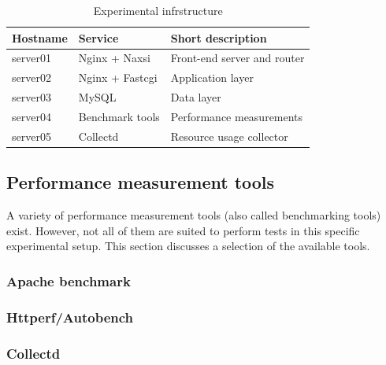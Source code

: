 \documentclass[Methods]{subfiles}
\begin{document}
\begin{table}[H]
\caption{Experimental infrstructure}
\begin{tabular}{|p{}|p{}|p{5cm}|}
\hline
\textbf{Hostname} & \textbf{Service} & \textbf{Short description} \\ \hline
server01 & Nginx + Naxsi & Front-end server and router \\ \hline
server02 & Nginx + Fastcgi & Application layer \\ \hline
server03 & MySQL & Data layer \\ \hline
server04 & Benchmark tools & Performance measurements \\ \hline
server05 & Collectd & Resource usage collector \\ \hline
\end{tabular}
\label{tab:Experimental infrastructure}
\end{table}

\subsection{Performance measurement tools}
A variety of performance measurement tools (also called benchmarking tools) exist. However, not all of them are suited to perform tests in this specific experimental setup. This section discusses a selection of the available tools.

\subsubsection{Apache benchmark}


\subsubsection{Httperf/Autobench}


\subsubsection{Collectd}

\end{document}

